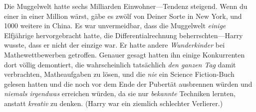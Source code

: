 Die Muggelwelt hatte sechs Milliarden Einwohner—Tendenz steigend. Wenn du einer in einer Million wärst, gäbe es zwölf von Deiner Sorte in New York, und 1000 weitere in China. Es war unvermeidbar, dass die Muggelwelt \emph{einige} Elfjährige hervorgebracht hatte, die Differentialrechnung beherrschten—Harry wusste, dass er nicht der einzige war. Er hatte andere \emph{Wunderkinder} bei Mathewettbewerben getroffen. Genauer gesagt hatten ihn einige Konkurrenten dort völlig demontiert, die wahrscheinlich tatsächlich \emph{den ganzen Tag} damit verbrachten, Matheaufgaben zu lösen, und die \emph{nie} ein Science Fiction-Buch gelesen hatten und die noch vor dem Ende der Pubertät ausbrennen würden und \emph{niemals irgendwas} erreichen würden, da sie nur \emph{bekannte} Techniken lernten, anstatt \emph{kreativ} zu denken. (Harry war ein ziemlich schlechter Verlierer.)


